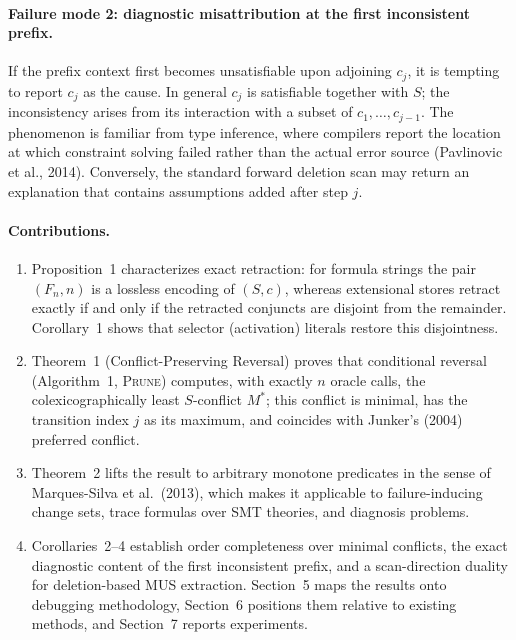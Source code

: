\documentclass[11pt,reqno]{amsart}
\theoremstyle{plain}
\theoremstyle{definition}
\newcommand{\Mstar}{M^{*}}
\newcommand{\PRUNE}{\textsc{Prune}}
\begin{document}
\paragraph{Failure mode 2: diagnostic misattribution at the first inconsistent
prefix.} If the prefix context first becomes unsatisfiable upon adjoining $c_j$,
it is tempting to report $c_j$ as the cause. In general $c_j$ is satisfiable
together with $S$; the inconsistency arises from its interaction with a subset of
$c_1,\dots,c_{j-1}$. The phenomenon is familiar from type inference, where
compilers report the location at which constraint solving failed rather than the
actual error source (Pavlinovic et al., 2014). Conversely, the standard forward
deletion scan may return an explanation that contains assumptions added after
step $j$.

\paragraph{Contributions.}
\begin{enumerate}
\item Proposition~1 characterizes exact retraction: for formula strings the pair
$(F_n,n)$ is a lossless encoding of $(S,c)$, whereas extensional stores retract
exactly if and only if the retracted conjuncts are disjoint from the remainder.
Corollary~1 shows that selector (activation) literals restore this disjointness.
\item Theorem~1 (Conflict-Preserving Reversal) proves that conditional reversal
(Algorithm~1, \PRUNE) computes, with exactly $n$ oracle calls, the
colexicographically least $S$-conflict $\Mstar$; this conflict is minimal, has the
transition index $j$ as its maximum, and coincides with Junker's (2004) preferred
conflict.
\item Theorem~2 lifts the result to arbitrary monotone predicates in the sense of
Marques-Silva et al.\ (2013), which makes it applicable to failure-inducing change
sets, trace formulas over SMT theories, and diagnosis problems.
\item Corollaries~2--4 establish order completeness over minimal conflicts, the
exact diagnostic content of the first inconsistent prefix, and a scan-direction
duality for deletion-based MUS extraction. Section~5 maps the results onto
debugging methodology, Section~6 positions them relative to existing methods, and
Section~7 reports experiments.
\end{enumerate}

\end{document}
